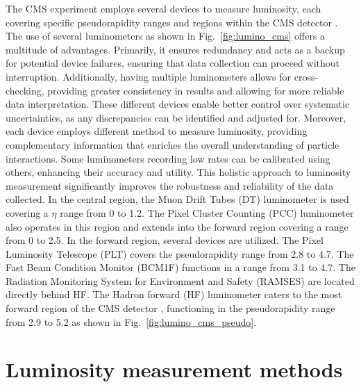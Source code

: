 The CMS experiment employs several devices to measure luminosity, each covering specific pseudorapidity ranges and regions within the CMS detector \cite{CMS-PAS-LUM-18-002}. The use of several luminometers as shown in Fig.~\ref{fig:lumino_cms} offers a multitude of advantages. Primarily, it ensures redundancy and acts as a backup for potential device failures, ensuring that data collection can proceed without interruption. Additionally, having multiple luminometers allows for cross-checking, providing greater consistency in results and allowing for more reliable data interpretation. These different devices enable better control over systematic uncertainties, as any discrepancies can be identified and adjusted for. Moreover, each device employs different method to measure luminosity, providing complementary information that enriches the overall understanding of particle interactions. Some luminometers recording low rates can be calibrated using others, enhancing their accuracy and utility. This holistic approach to luminosity measurement significantly improves the robustness and reliability of the data collected. In the central region, the Muon Drift Tubes (DT) luminometer is used covering a $\eta$ range from 0 to 1.2. The Pixel Cluster Counting (PCC) luminometer also operates in this region and extends into the forward region covering a range from 0 to 2.5. In the forward region, several devices are utilized. The Pixel Luminosity Telescope (PLT) covers the pseudorapidity range from 2.8 to 4.7. The Fast Beam Condition Monitor (BCM1F) functions in a range from 3.1 to 4.7. The Radiation Monitoring System for Environment and Safety (RAMSES) are located directly behind HF. The Hadron forward (HF) luminometer caters to the most forward region of the CMS detector \cite{Sirunyan:2759951}, functioning in the pseudorapidity range from 2.9 to 5.2 as shown in Fig.~\ref{fig:lumino_cms_pseudo}.


\section{Luminosity measurement methods}


